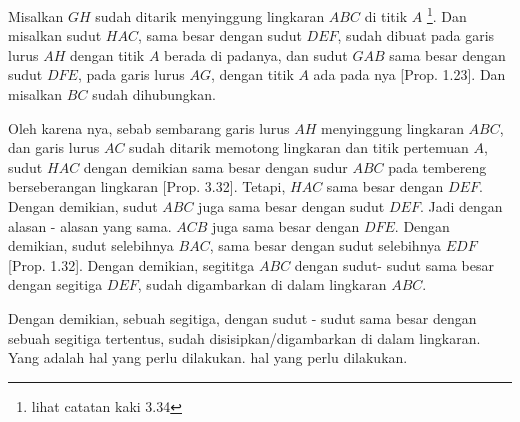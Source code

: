 \documentclass[a4paper]{book}
\begin{document}
Misalkan $GH$ sudah ditarik menyinggung lingkaran $ABC$ di titik $A$ 
\footnote{lihat catatan kaki 3.34}. Dan misalkan sudut $HAC$, sama besar
dengan sudut $DEF$, sudah dibuat pada garis lurus $AH$ dengan titik $A$ berada
di padanya, dan sudut $GAB$ sama besar dengan sudut  $DFE$, pada garis lurus
$AG$, dengan titik $A$ ada pada nya [Prop. 1.23]. Dan misalkan $BC$ sudah 
dihubungkan.

Oleh karena nya, sebab sembarang garis lurus $AH$ menyinggung lingkaran 
$ABC$, dan garis lurus $AC$ sudah ditarik memotong lingkaran dan titik 
pertemuan $A$, sudut $HAC$ dengan demikian sama besar dengan sudur $ABC$
pada tembereng berseberangan lingkaran [Prop. 3.32]. Tetapi, $HAC$ sama
besar dengan $DEF$. Dengan demikian, sudut $ABC$ juga sama besar dengan sudut
$DEF$. Jadi dengan alasan - alasan yang sama. $ACB$ juga sama besar dengan 
$DFE$. Dengan demikian, sudut selebihnya $BAC$, sama besar dengan sudut 
selebihnya $EDF$ [Prop. 1.32]. Dengan demikian, segititga $ABC$ dengan sudut- sudut sama besar dengan segitiga $DEF$, sudah digambarkan di dalam lingkaran
$ABC$.

Dengan demikian, sebuah segitiga, dengan sudut - sudut sama besar dengan 
sebuah segitiga tertentus, sudah disisipkan/digambarkan di dalam lingkaran. Yang adalah hal yang perlu dilakukan.
hal yang perlu dilakukan.

\end{document}
